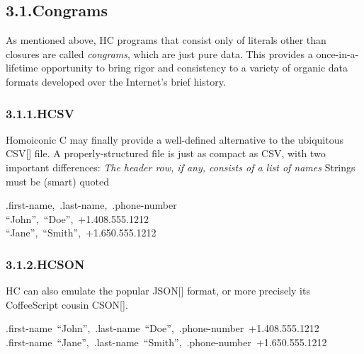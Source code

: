 \documentclass[preprint]{{acmart}}
\begin{document}
\subsection{3.1.\hspace*{0.5em}Congrams}\label{sec-congrams}%

\noindent{}As mentioned above, HC programs that consist only of literals other than closures 
are called \emph{congrams}, which are just pure data. This provides a 
once-in-a-lifetime opportunity to bring rigor and consistency to a variety of organic
data formats developed over the Internet's brief history.%

\subsubsection{3.1.1.\hspace*{0.5em}HCSV}\label{sec-hcsv}%

\noindent{}Homoiconic C may finally provide a well-defined alternative to the
ubiquitous CSV[] file. A properly-structured  file is just as compact
as CSV, with two important differences:
\emph{ The header row, if any, consists of a list of names
} Strings must be (smart) quoted%
\begin{mdpre}%
\noindent.first-name,~.last-name,~.phone-number\\
“{John}”,~“{Doe}”,~+1.{408.555}.{1212}\\
“{Jane}”,~“{Smith}”,~+1.{650.555}.{1212}%
\end{mdpre}
\subsubsection{3.1.2.\hspace*{0.5em}HCSON}\label{sec-hcson}%

\noindent{}HC can also emulate the popular JSON[] format, or more precisely its
CoffeeScript cousin CSON[].%
\begin{mdpre}%
\noindent.first-name~“{John}”,~.last-name~“{Doe}”,~.phone-number~+1.{408.555}.{1212}~~\\
.first-name~“{Jane}”,~.last-name~“{Smith}”,~.phone-number~+1.{650.555}.{1212}~~%
\end{mdpre}
\end{document}
